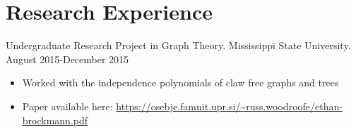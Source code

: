 \documentclass[11pt, a4paper]{awesome-cv}
\begin{document}
\hypertarget{research-experience}{%
\section{Research Experience}\label{research-experience}}

Undergraduate Research Project in Graph Theory. Mississippi State University. August 2015-December 2015

\begin{itemize}
\item
  Worked with the independence polynomials of claw free graphs and trees
\item
  Paper available here: \url{https://osebje.famnit.upr.si/~russ.woodroofe/ethan-brockmann.pdf}
\end{itemize}
\end{document}
